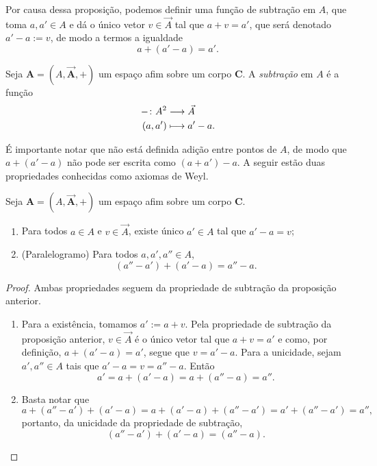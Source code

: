 Por causa dessa proposição, podemos definir uma função de subtração em $A$, que toma $a,a' \in A$ e dá o único vetor $v \in \vec{A}$ tal que $a+v=a'$, que será denotado $a'-a := v$, de modo a termos a igualdade
	\begin{equation*}
		a + (a'-a) = a'.
	\end{equation*}

\begin{definition}
Seja $\bm A = (A,\vec{\bm A},+)$ um espaço afim sobre um corpo $\bm C$. A \emph{subtração} em $A$ é a função
	\begin{align*}
		{-}\colon {A^2} &\longrightarrow {\vec{A}} \\{(a,a')} &\longmapsto a'-a.
	\end{align*}
\end{definition}

É importante notar que não está definida adição entre pontos de $A$, de modo que $a+(a'-a)$ não pode ser escrita como $(a+a')-a$. A seguir estão duas propriedades conhecidas como axiomas de Weyl.

\begin{proposition}
\label{alg:prop.afim}
Seja $\bm A = (A,\vec{\bm A},+)$ um espaço afim sobre um corpo $\bm C$.
	\begin{enumerate}
		\item Para todos $a \in A$ e $v \in \vec{A}$, existe único $a' \in A$ tal que $a'-a=v$;
		\item (Paralelogramo) Para todos $a,a',a'' \in A$,
			\begin{equation*}
				(a''-a')+(a'-a) = a''-a.
			\end{equation*}
	\end{enumerate}
\end{proposition}
\begin{proof}
Ambas propriedades seguem da propriedade de subtração da proposição anterior.
	\begin{enumerate}
		\item Para a existência, tomamos $a' := a+v$. Pela propriedade de subtração da proposição anterior, $v \in \vec{A}$ é o único vetor tal que $a+v=a'$ e como, por definição, $a+(a'-a)=a'$, segue que $v=a'-a$. Para a unicidade, sejam $a',a'' \in A$ tais que $a'-a = v = a''-a$. Então
			\begin{equation*}
				a' = a+(a'-a) = a+(a''-a) = a''.
			\end{equation*}
		
		\item Basta notar que
			\begin{equation*}
				a+(a''-a')+(a'-a) = a+(a'-a)+(a''-a') = a'+(a''-a') = a'',
			\end{equation*}
		portanto, da unicidade da propriedade de subtração,
			\begin{equation*}
				(a''-a')+(a'-a) = (a''-a).
			\end{equation*}
	\end{enumerate}
\end{proof}

